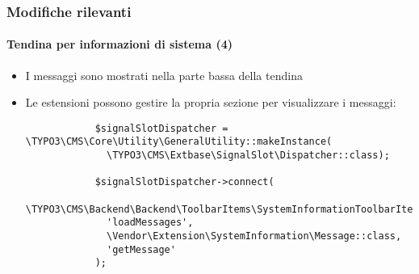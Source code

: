 \begin{frame}[fragile]
	\frametitle{Modifiche rilevanti}
	\framesubtitle{Tendina per informazioni di sistema (4)}

	\lstset{basicstyle=\tiny\ttfamily}

	\begin{itemize}

		\item I messaggi sono mostrati nella parte bassa della tendina

		\item Le estensioni possono gestire la propria sezione per visualizzare i messaggi:

		\begin{lstlisting}
			$signalSlotDispatcher = \TYPO3\CMS\Core\Utility\GeneralUtility::makeInstance(
			  \TYPO3\CMS\Extbase\SignalSlot\Dispatcher::class);

			$signalSlotDispatcher->connect(
			  \TYPO3\CMS\Backend\Backend\ToolbarItems\SystemInformationToolbarItem::class,
			  'loadMessages',
			  \Vendor\Extension\SystemInformation\Message::class,
			  'getMessage'
			);
		\end{lstlisting}

	\end{itemize}

\end{frame}

